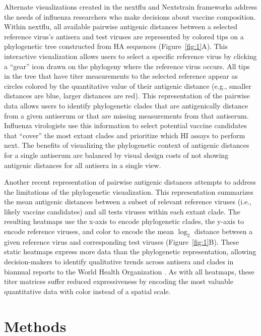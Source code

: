 \documentclass[utf8]{FrontiersinHarvard} %
\begin{document}
Alternate visualizations created in the nextflu \citep{NeherBedford2018} and Nextstrain \citep{Hadfield2018} frameworks address the needs of influenza researchers who make decisions about vaccine composition.
Within nextflu, all available pairwise antigenic distances between a selected reference virus's antisera and test viruses are represented by colored tips on a phylogenetic tree constructed from HA sequences (Figure~\ref{fig:1}A).
This interactive visualization allows users to select a specific reference virus by clicking a ``gear'' icon drawn on the phylogeny where the reference virus occurs.
All tips in the tree that have titer measurements to the selected reference appear as circles colored by the quantitative value of their antigenic distance (e.g., smaller distances are blue, larger distances are red).
This representation of the pairwise data allows users to identify phylogenetic clades that are antigenically distance from a given antiserum or that are missing measurements from that antiserum.
Influenza virologists use this information to select potential vaccine candidates that ``cover'' the most extant clades and prioritize which HI assays to perform next.
The benefits of visualizing the phylogenetic context of antigenic distances for a single antiserum are balanced by visual design costs of not showing antigenic distances for all antisera in a single view.

Another recent representation of pairwise antigenic distances attempts to address the limitations of the phylogenetic visualization.
This representation summarizes the mean antigenic distances between a subset of relevant reference viruses (i.e., likely vaccine candidates) and all tests viruses within each extant clade.
The resulting heatmaps use the x-axis to encode phylogenetic clades, the y-axis to encode reference viruses, and color to encode the mean $\log_{2}$ distance between a given reference virus and corresponding test viruses (Figure~\ref{fig:1}B).
These static heatmaps express more data than the phylogenetic representation, allowing decision-makers to identify qualitative trends across antisera and clades in biannual reports to the World Health Organization \citep{BedfordWHO2018,BedfordWHO2019}.
As with all heatmaps, these titer matrices suffer reduced expressiveness by encoding the most valuable quantitative data with color instead of a spatial scale.

\section{Methods}
\end{document}
